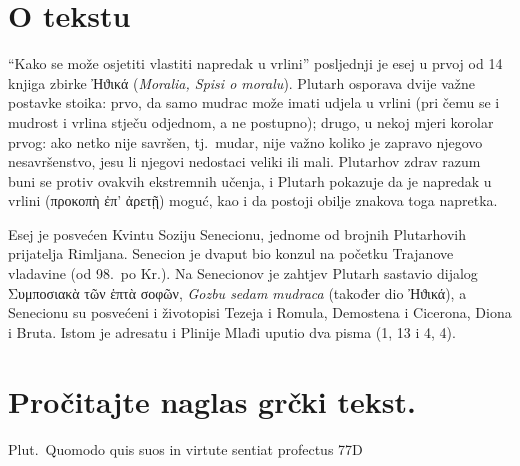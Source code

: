 

\section*{O tekstu}

``Kako se može osjetiti vlastiti napredak u vrlini'' posljednji je esej u prvoj od 14 knjiga zbirke \textgreek[variant=ancient]{Ἠϑικά} (\textit{Moralia, Spisi o moralu}). Plutarh osporava dvije važne postavke stoika: prvo, da samo mudrac može imati udjela u vrlini (pri čemu se i mudrost i vrlina stječu odjednom, a ne postupno); drugo, u nekoj mjeri korolar prvog: ako netko nije savršen, tj.\ mudar, nije važno koliko je zapravo njegovo nesavršenstvo, jesu li njegovi nedostaci veliki ili mali. Plutarhov zdrav razum buni se protiv ovakvih ekstremnih učenja, i Plutarh pokazuje da je napredak u vrlini \textgreek[variant=ancient]{(προκοπὴ ἐπ' ἀρετῇ)} moguć, kao i da postoji obilje znakova toga napretka.

Esej je posvećen Kvintu Soziju Senecionu, jednome od brojnih Plutarhovih prijatelja Rimljana. Senecion je dvaput bio konzul na početku Trajanove vladavine (od 98.\ po Kr.). Na Senecionov je zahtjev Plutarh sastavio dijalog \textgreek[variant=ancient]{Συμποσιακὰ τῶν ἑπτὰ σοφῶν,} \textit{Gozbu sedam mudraca} (također dio \textgreek[variant=ancient]{Ἠϑικά}), a Senecionu su posvećeni i životopisi Tezeja i Romula, Demostena i Cicerona, Diona i Bruta. Istom je adresatu i Plinije Mlađi uputio dva pisma (1, 13 i 4, 4).


\section*{Pročitajte naglas grčki tekst.}

Plut.\ Quomodo quis suos in virtute sentiat profectus 77D


\medskip


